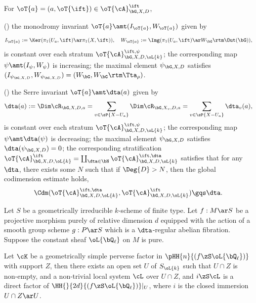 \documentclass[a4paper, twoside]{article}
\begin{document}
\begin{thm}
	For $\oT{a}=(a,\oT{\ift})\in\oT{\cA}_{\bG,X,D}^{\ift}$,
	\begin{itm}
		\item (\cite[Proposition~5.4.3, Lemma~5.4.5, Lemma~5.4.8]{Ngo2010Lemme}) the monodromy invariant $\oT{a}\amt(I_{\oT{a}},W_{\oT{a}})$ given by
	\[
		I_{\oT{a}}:=\Ker(\pi_{1}(U_{a},\ift)\ar\pi_{1}(X,\ift)),\quad W_{\oT{a}}:=\Img(\pi_{1}(U_{a},\ift)\ar W_{\bG}\rtm\Out(\bG)),
	\]
	is constant over each stratum $\oT{\cA}_{\bG,X,D,\oL{k}}^{\ift,\psi}$; the corresponding map $\psi\amt(I_{\psi},W_{\psi})$ is increasing; the maximal element $\psi_{\bG,X,D}$ satisfies $(I_{\psi_{\bG,X,D}},W_{\psi_{\bG,X,D}})=(W_{\bG},W_{\bG}\rtm\Tta_{\rho})$.
	\item (\cite[Lemma~5.6.1, Lemma~5.6.4, Proposition~5.7.2]{Ngo2010Lemme}) the Serre invariant $\oT{a}\amt\dta(a)$ given by
	\[
		\dta(a):=\Dim\cR_{\bG,X,D,a}=\sum_{v\in \sP{X-U_{a}}}\Dim\cR_{\bG,X_{v},D,a}=\sum_{v\in \sP{X-U_{a}}}\dta_{v}(a),
	\]
	is constant over each stratum $\oT{\cA}_{\bG,X,D,\oL{k}}^{\ift,\psi}$; the corresponding map $\psi\amt\dta(\psi)$ is decreasing; the maximal element $\psi_{\bG,X,D}$ satisfies $\dta(\psi_{\bG,X,D})=0$; the corresponding stratification $\oT{\cA}_{\bG,X,D,\oL{k}}^{\ift}=\coprod_{\dta\in\bN}\oT{\cA}_{\bG,X,D,\oL{k}}^{\ift,\dta}$ satisfies that for any $\dta$, there exists some $N$ such that if $\Deg{D}>N$, then the global codimension estimate holds,
	\[
		\Cdm(\oT{\cA}_{\bG,X,D,\oL{k}}^{\ift,\dta},\oT{\cA}_{\bG,X,D,\oL{k}}^{\ift})\gqs\dta.
	\]
	\end{itm}
\end{thm}

\begin{thm}
	Let $S$ be a geometrically irreducible $k$-scheme of finite type. Let $f:M\ar S$ be a projective morphism purely of relative dimension $d$ equipped with the action of a smooth group scheme $g:P\ar S$ which is a $\dta$-regular abelian fibration. Suppose the constant sheaf $\oL{\bQ_{\ell}}$ on $M$ is pure.

	Let $\cK$ be a geometrically simple perverse factor in $\pHH{n}{(f\zS\oL{\bQ_{\ell}})}$ with support $Z$, then there exists an open set $U$ of $S_{\oL{k}}$ such that $U\cap Z$ is non-empty, and a non-trivial local system $\cL$ over $U\cap Z$, and $i\zS\cL$ is a direct factor of $\HH{}{2d}{(f\zS\oL{\bQ_{\ell}})}|_{U}$, where $i$ is the closed immersion $U\cap Z\ar U$.
\end{thm}
\end{document}
